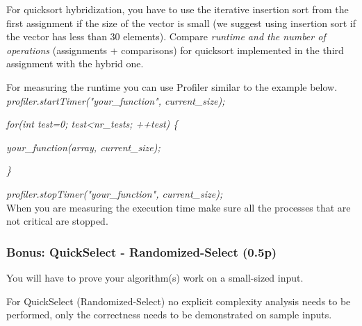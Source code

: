 \documentclass[../en-fa-lab.tex]{subfiles}
\begin{document}
For quicksort hybridization, you have to use the iterative insertion
sort from the first assignment if the size of the vector is small (we
suggest using insertion sort if the vector has less than 30 elements).
Compare \emph{runtime and the number of operations} (assignments +
comparisons) for quicksort implemented in the third assignment with the
hybrid one.

For measuring the runtime you can use Profiler similar to the example
below.
\\

\emph{profiler.startTimer("your\_function", current\_size);}

\emph{for(int test=0; test\textless nr\_tests; ++test) \{}

\quad\emph{your\_function(array, current\_size);}

\emph{\}}

\emph{profiler.stopTimer("your\_function", current\_size);}
\\

When you are measuring the execution time make sure all the processes
that are not critical are stopped.

\subsubsection{Bonus: QuickSelect - Randomized-Select
(0.5p)}\label{bonus-quickselect---randomized-select-0.5p}

You will have to prove your algorithm(s) work on a small-sized input.

For QuickSelect (Randomized-Select) no explicit complexity analysis
needs to be performed, only the correctness needs to be demonstrated on
sample inputs.
\end{document}
